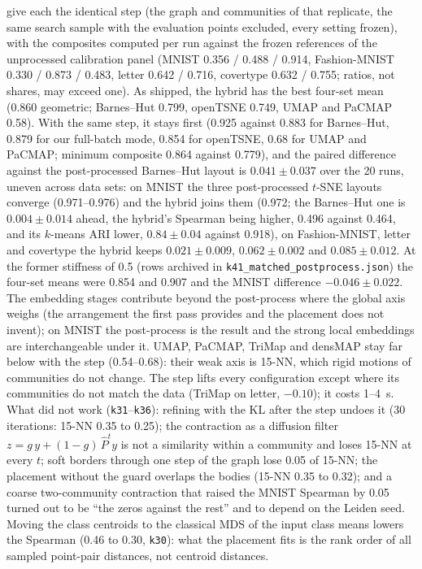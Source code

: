 \documentclass[11pt]{article}
\begin{document}
give each the identical step (the graph and communities of that replicate, the same search sample with the
evaluation points excluded, every setting frozen), with the composites computed per run against the frozen
references of the unprocessed calibration panel (MNIST 0.356 / 0.488 / 0.914, Fashion-MNIST 0.330 / 0.873 /
0.483, letter 0.642 / 0.716, covertype 0.632 / 0.755; ratios, not shares, may exceed one). As shipped, the hybrid
has the best four-set mean (0.860 geometric; Barnes--Hut 0.799, openTSNE 0.749, UMAP and PaCMAP 0.58). With the
same step, it stays first (0.925 against 0.883 for Barnes--Hut, 0.879 for our full-batch mode, 0.854 for
openTSNE, 0.68 for UMAP and PaCMAP; minimum composite 0.864 against 0.779), and the paired difference against
the post-processed Barnes--Hut layout is $0.041 \pm 0.037$ over the 20 runs, uneven across data sets: on
MNIST the three post-processed $t$-SNE layouts converge (0.971--0.976) and the hybrid joins them (0.972; the
Barnes--Hut one is $0.004 \pm 0.014$ ahead, the hybrid's Spearman being higher, 0.496 against 0.464, and its
$k$-means ARI lower, $0.84 \pm 0.04$ against 0.918), on Fashion-MNIST,
letter and covertype the hybrid keeps $0.021 \pm 0.009$, $0.062 \pm 0.002$ and $0.085 \pm 0.012$. At the former
stiffness of 0.5 (rows archived in \texttt{k41\_matched\_postprocess.json}) the four-set means were 0.854 and
0.907 and the MNIST difference $-0.046 \pm 0.022$. The embedding
stages contribute beyond the post-process where the global axis weighs (the arrangement the first pass provides
and the placement does not invent); on MNIST the post-process is the result and the strong local embeddings are
interchangeable under it. UMAP, PaCMAP, TriMap and densMAP stay far below with the step (0.54--0.68): their weak
axis is 15-NN, which rigid motions of communities do not change. The step lifts every configuration except where
its communities do not match the data (TriMap on letter, $-0.10$); it costs 1--4~s. What did not work (\texttt{k31}--\texttt{k36}): refining with the KL after the step
undoes it (30 iterations: 15-NN 0.35 to 0.25); the contraction as a diffusion filter $z = g\,y + (1 -
g)\,\hat P^t y$ is not a similarity within a community and loses 15-NN at every $t$; soft borders through
one step of the graph lose 0.05 of 15-NN; the placement without the guard overlaps the bodies (15-NN 0.35
to 0.32); and a coarse two-community contraction that raised the MNIST Spearman by 0.05 turned out to be
``the zeros against the rest'' and to depend on the Leiden seed. Moving the class centroids to the
classical MDS of the input class means lowers the Spearman (0.46 to 0.30, \texttt{k30}): what the
placement fits is the rank order of all sampled point-pair distances, not centroid distances.
\end{document}
